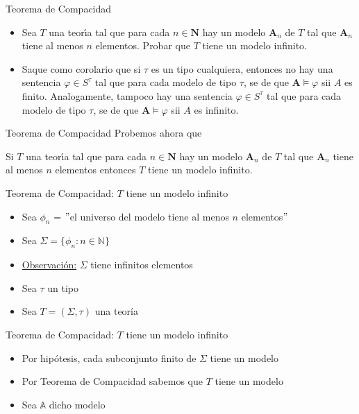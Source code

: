 \documentclass[10pt]{beamer}
\begin{document}
\begin{frame}{Teorema de Compacidad}

    \begin{itemize}[<+->]
      \item Sea $T$ una teor\'{\i}a tal que para cada $n\in \mathbf{N}$ hay un
          modelo $\mathbf{A}_{n}$ de $T$ tal que $\mathbf{A}_{n}$ tiene al menos $n$
          elementos. Probar que $T$ tiene un modelo infinito.
      \item Saque como corolario que
      si $\tau $ es un tipo cualquiera, entonces no hay una sentencia $\varphi \in
      S^{\tau }$ tal que para cada modelo de tipo $\tau $, se de que $\mathbf{A}%
      \vDash \varphi $ sii $A$ es finito. Analogamente, tampoco hay una sentencia $%
      \varphi \in S^{\tau }$ tal que para cada modelo de tipo $\tau $, se de que $%
      \mathbf{A}\vDash \varphi $ sii $A$ es infinito.
    \end{itemize}

\end{frame}


\begin{frame}{Teorema de Compacidad}
  Probemos ahora que
  \begin{center}
    Si $T$ una teor\'{\i}a tal que para cada $n\in \mathbf{N}$ hay un
    modelo $\mathbf{A}_{n}$ de $T$ tal que $\mathbf{A}_{n}$ tiene al menos $n$
    elementos entonces $T$ tiene un modelo infinito.
  \end{center}

\end{frame}



\begin{frame}{Teorema de Compacidad: $T$ tiene un modelo infinito}

  \begin{itemize}[<+->]
    \item Sea $\phi_{n}$ = $"$el universo del modelo tiene al menos $n$ elementos$"$
    \item Sea $\Sigma = \{\phi_{n} : n \in \mathbb{N}\}$
    \item \underline{Observación:} $\Sigma$ tiene infinitos elementos
    \item Sea $\tau$ un tipo
    \item Sea $T = (\Sigma, \tau)$ una teoría
  \end{itemize}

\end{frame}


\begin{frame}{Teorema de Compacidad: $T$ tiene un modelo infinito}

  \begin{itemize}[<+->]
    \item Por hipótesis, cada subconjunto finito de $\Sigma$ tiene un modelo
    \item Por Teorema de Compacidad sabemos que $T$ tiene un modelo
    \item Sea $\mathbb{A}$ dicho modelo
  \end{itemize}

\end{frame}
\end{document}
